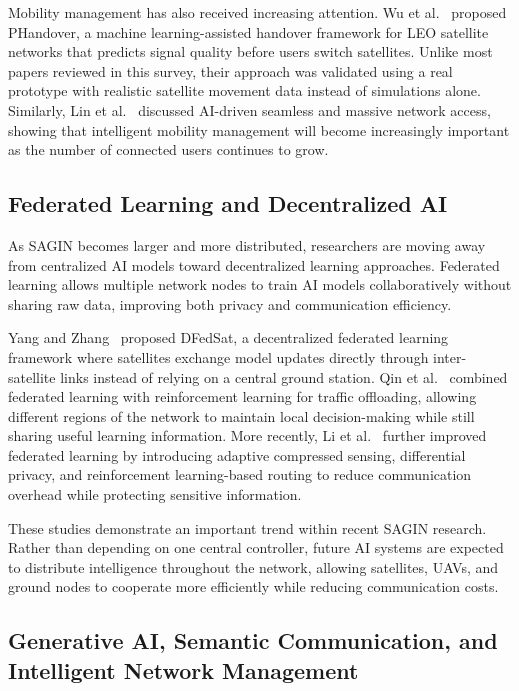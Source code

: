 \documentclass[letterpaper]{article} %
\begin{document}
Mobility management has also received increasing attention. Wu et al.~\citep{wu2025phandover} proposed PHandover, a machine learning-assisted handover framework for LEO satellite networks that predicts signal quality before users switch satellites. Unlike most papers reviewed in this survey, their approach was validated using a real prototype with realistic satellite movement data instead of simulations alone. Similarly, Lin et al.~\citep{lin2025ai} discussed AI-driven seamless and massive network access, showing that intelligent mobility management will become increasingly important as the number of connected users continues to grow.

\subsection{Federated Learning and Decentralized AI}

As SAGIN becomes larger and more distributed, researchers are moving away from centralized AI models toward decentralized learning approaches. Federated learning allows multiple network nodes to train AI models collaboratively without sharing raw data, improving both privacy and communication efficiency.

Yang and Zhang~\citep{yang2024dfedsat} proposed DFedSat, a decentralized federated learning framework where satellites exchange model updates directly through inter-satellite links instead of relying on a central ground station. Qin et al.~\citep{qin2024differentiated} combined federated learning with reinforcement learning for traffic offloading, allowing different regions of the network to maintain local decision-making while still sharing useful learning information. More recently, Li et al.~\citep{li2026adaptive} further improved federated learning by introducing adaptive compressed sensing, differential privacy, and reinforcement learning-based routing to reduce communication overhead while protecting sensitive information.

These studies demonstrate an important trend within recent SAGIN research. Rather than depending on one central controller, future AI systems are expected to distribute intelligence throughout the network, allowing satellites, UAVs, and ground nodes to cooperate more efficiently while reducing communication costs.

\subsection{Generative AI, Semantic Communication, and Intelligent Network Management}
\end{document}
